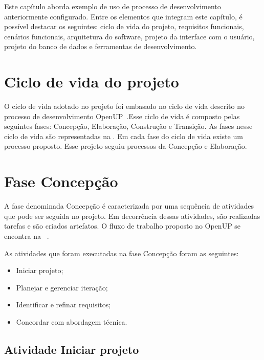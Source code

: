 Este capítulo aborda exemplo de uso de processo de desenvolvimento anteriormente configurado. Entre os elementos que integram este capítulo, é possível destacar os seguintes: ciclo de vida do projeto, requisitos funcionais, cenários funcionais, arquitetura do software, projeto da interface com o usuário, projeto do banco de dados e ferramentas de desenvolvimento.


\section{Ciclo de vida do projeto}
O ciclo de vida adotado no projeto foi embasado no ciclo de vida descrito no processo de desenvolvimento  OpenUP~\cite{openup}.Esse ciclo de vida é composto pelas seguintes fases: Concepção, Elaboração, Construção e Transição. As fases nesse ciclo de vida são representadas na . Em cada fase do ciclo de vida existe um processo proposto. Esse projeto seguiu processos da Concepção e  Elaboração.

%

\section{Fase Concepção}

A fase denominada Concepção é caracterizada por uma sequência de atividades que pode ser seguida no projeto. Em decorrência dessas atividades, são realizadas tarefas e são criados artefatos. O fluxo de trabalho proposto no OpenUP se encontra na ~.

%

As atividades que foram executadas na fase Concepção foram as seguintes:
\begin{itemize}
    \item Iniciar projeto;
    \item Planejar e gerenciar iteração;
    \item Identificar e refinar requisitos;
    \item Concordar com abordagem técnica.
\end{itemize}

\subsection{Atividade Iniciar projeto}

